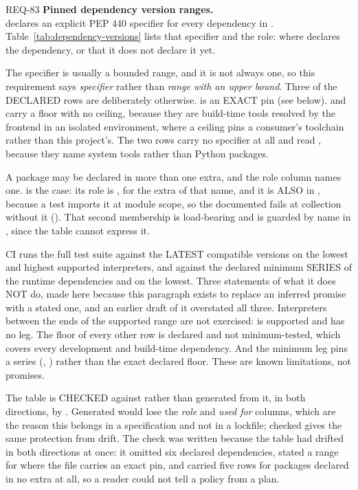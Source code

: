 \begin{reqbox}{REQ-83}{\stable}
\textbf{Pinned dependency version ranges.}\\
\itc{} declares an explicit PEP 440 specifier for every dependency in
. Table~\ref{tab:dependency-versions} lists that
specifier and the role: where  declares the
dependency, or that it does not declare it yet.

The specifier is usually a bounded range, and it is not always one, so
this requirement says \emph{specifier} rather than \emph{range with an
upper bound}. Three of the DECLARED rows are deliberately otherwise.
 is an EXACT pin (see below).  and
 carry a floor with no ceiling, because they are
build-time tools resolved by the frontend in an isolated environment,
where a ceiling pins a consumer's toolchain rather than this project's.
The two  rows carry no specifier at all and read
, because they name system tools rather than Python
packages.

A package may be declared in more than one extra, and the role column
names one.  is the case: its role is , for
the extra of that name, and it is ALSO in , because a test
imports it at module scope, so the documented
 fails at collection without it
(). That second membership is load-bearing and is
guarded by name in , since the
table cannot express it.

CI runs the full test suite against the LATEST compatible versions on
the lowest and highest supported interpreters, and against the declared
minimum SERIES of the runtime dependencies  and
 on the lowest. Three statements of what it does NOT do,
made here because this paragraph exists to replace an inferred promise
with a stated one, and an earlier draft of it overstated all three.
Interpreters between the ends of the supported range are not exercised:
 is supported and has no leg. The floor of every other row
is declared and not minimum-tested, which covers every development and
build-time dependency. And the minimum leg pins a series
(, ) rather than the exact declared floor.
These are known limitations, not promises.

The table is CHECKED against  rather than
generated from it, in both directions, by
. Generated would lose the
\emph{role} and \emph{used for} columns, which are the reason this
belongs in a specification and not in a lockfile; checked gives the
same protection from drift. The check was written because the table had
drifted in both directions at once: it omitted six declared
dependencies, stated a range for  where the file carries an
exact pin, and carried five rows for packages declared in no extra at
all, so a reader could not tell a policy from a plan.


\end{reqbox}
